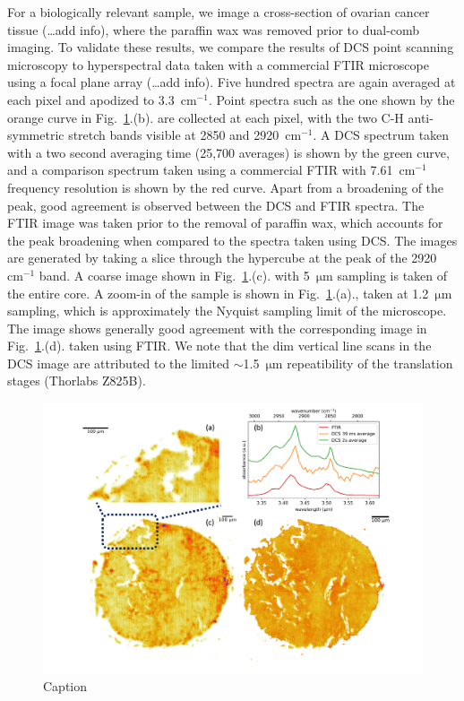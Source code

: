 \documentclass{optica-article}
\begin{document}
For a biologically relevant sample, we image a cross-section of ovarian cancer tissue (\dots add info), where the paraffin wax was removed prior to dual-comb imaging. To validate these results, we compare the results of DCS point scanning microscopy to hyperspectral data taken with a commercial FTIR microscope using a focal plane array (\dots add info). Five hundred spectra are again averaged at each pixel and apodized to \mbox{3.3 $\mathrm{cm^{-1}}$}. Point spectra such as the one shown by the orange curve in \mbox{Fig. \ref{fig:bio}.(b).} are collected at each pixel, with the two C-H anti-symmetric stretch bands visible at 2850 and \mbox{2920 $\mathrm{cm^{-1}}$}. A DCS spectrum taken with a two second averaging time (25,700 averages) is shown by the green curve, and a comparison spectrum taken using a commercial FTIR with \mbox{7.61 $\mathrm{cm^{-1}}$} frequency resolution is shown by the red curve. Apart from a broadening of the peak, good agreement is observed between the DCS and FTIR spectra. The FTIR image was taken prior to the removal of paraffin wax, which accounts for the peak broadening when compared to the spectra taken using DCS. The images are generated by taking a slice through the hypercube at the peak of the \mbox{2920 $\mathrm{cm^{-1}}$} band. A coarse image shown in \mbox{Fig. \ref{fig:bio}.(c).} with \mbox{5 $\mathrm{\mu m}$} sampling is taken of the entire core. A zoom-in of the sample is shown in \mbox{Fig. \ref{fig:bio}.(a).}, taken at \mbox{1.2 $\mathrm{\mu m}$} sampling, which is approximately the Nyquist sampling limit of the microscope. The image shows generally good agreement with the corresponding image in \mbox{Fig. \ref{fig:bio}.(d).} taken using FTIR. We note that the dim vertical line scans in the DCS image are attributed to the limited \mbox{$\sim$1.5 $\mathrm{\mu m}$} repeatibility of the translation stages (Thorlabs Z825B).


\begin{figure}[h]
    \centering
    \includegraphics[width=\linewidth]{bio_image_w_FTIR_comparison.png}
    \caption{Caption}
    \label{fig:bio}
\end{figure}
\end{document}
